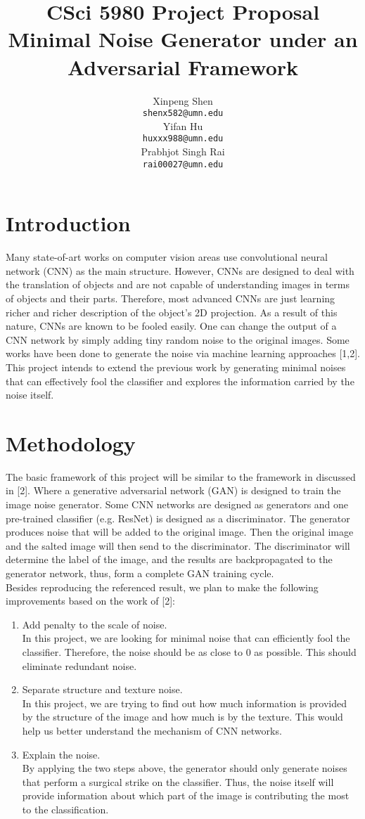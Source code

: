 \documentclass{article}
\title{CSci 5980 Project Proposal \\ 
    \large Minimal Noise Generator under an Adversarial Framework}
\author{%
  Xinpeng Shen\\
  \texttt{shenx582@umn.edu} \\
  \And
  Yifan Hu\\
  \texttt{huxxx988@umn.edu} \\
  \And 
  Prabhjot Singh Rai \\
  \texttt{rai00027@umn.edu} \\
}
\begin{document}
\maketitle

\section{Introduction}
Many state-of-art works on computer vision areas use convolutional neural network (CNN) as the main structure. However, CNNs are designed to deal with the translation of objects and are not capable of understanding images in terms of objects and their parts. Therefore, most advanced CNNs are just learning richer and richer description of the object's 2D projection. As a result of this nature, CNNs are known to be fooled easily. One can change the output of a CNN network by simply adding tiny random noise to the original images. Some works have been done to generate the noise via machine learning approaches [1,2]. This project intends to extend the previous work by generating minimal noises that can effectively fool the classifier and explores the information carried by the noise itself.

\section{Methodology}
The basic framework of this project will be similar to the framework in discussed in [2]. Where a generative adversarial network (GAN) is designed to train the image noise generator. Some CNN networks are designed as generators and one pre-trained classifier (e.g. ResNet) is designed as a discriminator. The generator produces noise that will be added to the original image. Then the original image and the salted image will then send to the discriminator. The discriminator will determine the label of the image, and the results are backpropagated to the generator network, thus, form a complete GAN training cycle.  \\
Besides reproducing the referenced result, we plan to make the following improvements based on the work of [2]:
\begin{enumerate}
    \item Add penalty to the scale of noise.\\
    In this project, we are looking for minimal noise that can efficiently fool the classifier. Therefore, the noise should be as close to 0 as possible. This should eliminate redundant noise.
    \item Separate structure and texture noise.\\
    In this project, we are trying to find out how much information is provided by the structure of the image and how much is by the texture. This would help us better understand the mechanism of CNN networks.
    \item Explain the noise.\\
    By applying the two steps above, the generator should only generate noises that perform a surgical strike on the classifier. Thus, the noise itself will provide information about which part of the image is contributing the most to the classification.
\end{enumerate}
\end{document}

